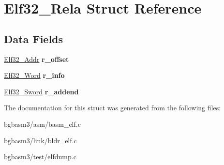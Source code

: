 \hypertarget{structElf32__Rela}{\section{Elf32\-\_\-\-Rela Struct Reference}
\label{structElf32__Rela}
}
\subsection*{Data Fields}
\begin{DoxyCompactItemize}
\item 
\hypertarget{structElf32__Rela_aa850a306ee7fa3935a9f8c3d1aae4e51}{\hyperlink{structElf32__Addr}{Elf32\-\_\-\-Addr} {\bfseries r\-\_\-offset}}\label{structElf32__Rela_aa850a306ee7fa3935a9f8c3d1aae4e51}

\item 
\hypertarget{structElf32__Rela_ac3a79d3f04209c33ddb4c36d07e68a79}{\hyperlink{structElf32__Sword}{Elf32\-\_\-\-Word} {\bfseries r\-\_\-info}}\label{structElf32__Rela_ac3a79d3f04209c33ddb4c36d07e68a79}

\item 
\hypertarget{structElf32__Rela_a1952286a900648afb9029c68a8bcea4d}{\hyperlink{structElf32__Sword}{Elf32\-\_\-\-Sword} {\bfseries r\-\_\-addend}}\label{structElf32__Rela_a1952286a900648afb9029c68a8bcea4d}

\end{DoxyCompactItemize}


The documentation for this struct was generated from the following files\-:\begin{DoxyCompactItemize}
\item 
bgbasm3/asm/basm\-\_\-elf.\-c\item 
bgbasm3/link/bldr\-\_\-elf.\-c\item 
bgbasm3/test/elfdump.\-c\end{DoxyCompactItemize}
